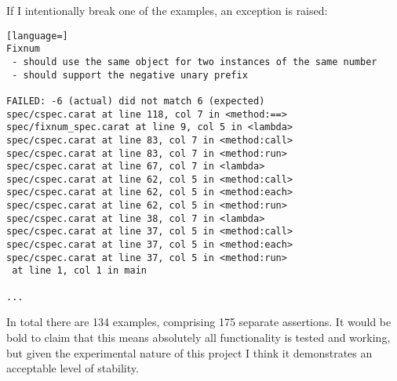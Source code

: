 If I intentionally break one of the examples, an exception is raised:

\begin{lstlisting}[language=]
Fixnum
 - should use the same object for two instances of the same number
 - should support the negative unary prefix

FAILED: -6 (actual) did not match 6 (expected)
spec/cspec.carat at line 118, col 7 in <method:==>
spec/fixnum_spec.carat at line 9, col 5 in <lambda>
spec/cspec.carat at line 83, col 7 in <method:call>
spec/cspec.carat at line 83, col 7 in <method:run>
spec/cspec.carat at line 67, col 7 in <lambda>
spec/cspec.carat at line 62, col 5 in <method:call>
spec/cspec.carat at line 62, col 5 in <method:each>
spec/cspec.carat at line 62, col 5 in <method:run>
spec/cspec.carat at line 38, col 7 in <lambda>
spec/cspec.carat at line 37, col 5 in <method:call>
spec/cspec.carat at line 37, col 5 in <method:each>
spec/cspec.carat at line 37, col 5 in <method:run>
 at line 1, col 1 in main

...
\end{lstlisting}

In total there are 134 examples, comprising 175 separate assertions. It would be bold to claim that this means absolutely all functionality is tested and working, but given the experimental nature of this project I think it demonstrates an acceptable level of stability.
